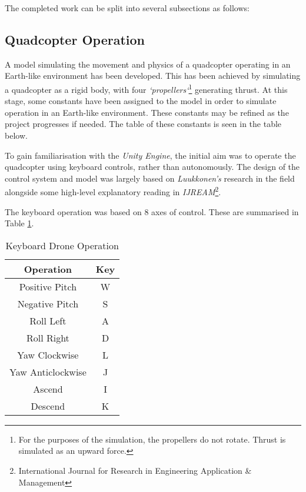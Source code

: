 \documentclass{article}
\begin{document}
The completed work can be split into several subsections as follows:

\subsection{Quadcopter Operation}
A model simulating the movement and physics of a quadcopter operating in an Earth-like environment has been developed. This has been achieved by simulating a quadcopter as a rigid body, with four \emph{`propellers`}\footnote{For the purposes of the simulation, the propellers do not rotate. Thrust is simulated as an upward force.} generating thrust. At this stage, some constants have been assigned to the model in order to simulate operation in an Earth-like environment. These constants may be refined as the project progresses if needed. The table of these constants is seen in the table below.

To gain familiarisation with the \emph{Unity Engine}, the initial aim was to operate the quadcopter using keyboard controls, rather than autonomously. The design of the control system and model was largely based on \emph{Luukkonen's} research in the field\cite{Luukkonen} alongside some high-level explanatory reading in \emph{IJREAM}\footnote{International Journal for Research in Engineering Application \& Management}\cite{Tatale}.

The keyboard operation was based on 8 axes of control. These are summarised in Table \ref{tab:keyboard-operation}.

\begin{table}[H]
    \centering
    \begin{tabular}{|c|c|}
        \hline
        \textbf{Operation} & \textbf{Key} \\
        \hline
        Positive Pitch & W \\
        \hline
        Negative Pitch & S \\
        \hline
        Roll Left & A \\
        \hline
        Roll Right & D \\
        \hline
        Yaw Clockwise & L \\
        \hline
        Yaw Anticlockwise & J \\
        \hline
        Ascend & I \\
        \hline
        Descend & K \\
        \hline
    \end{tabular}
    \caption{Keyboard Drone Operation}
    \label{tab:keyboard-operation}
\end{table}
\end{document}
